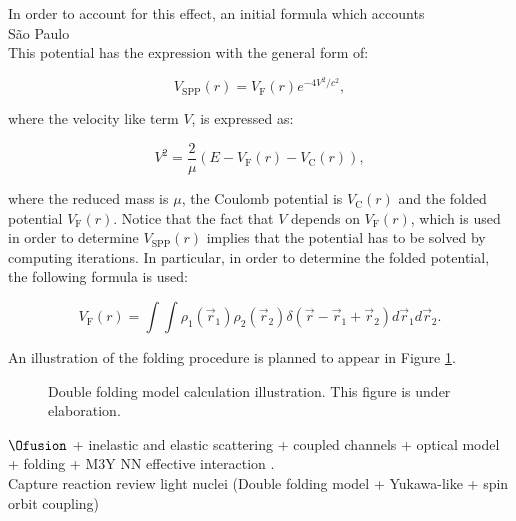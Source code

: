 \documentclass[openany]{book}
\begin{document}
In order to account for this effect, an initial formula which accounts  \\

São Paulo \cite{chamon_2007} \\

This potential has the expression with the general form of:

\begin{equation} \label{eq:potential_SaoPaulo}
	V_{\mathrm{SPP}} (r) = V_{\mathrm{F}} (r)e^{-4V^2/c^2},
\end{equation}

where the velocity like term $V$, is expressed as: 

\begin{equation} \label{eq:potential_SaoPaulo_speed}
	V^2 = \frac{2}{\mu} \left( E - V_{\mathrm{F}}(r) - V_{\mathrm{C}}(r) \right),
\end{equation}

where the reduced mass is $\mu$, the Coulomb potential is $V_{\mathrm{C}}(r)$ and the folded potential  $V_{\mathrm{F}}(r)$. Notice that the fact that $V$ depends on $V_{\mathrm{F}}(r)$, which is used in order to determine $V_{\mathrm{SPP}} (r)$ implies that the potential has to be solved by computing iterations. In particular, in order to determine the folded potential, the following formula is used:  

\begin{equation} \label{eq:potential_SaoPaulo_folding}
	V_{\mathrm{F}}(r) = \int \int \rho_1(\vec r_1)  \rho_2(\vec r_2) \delta(\vec r - \vec r_1 +  \vec r_2) {d\vec{r}_1}  {d\vec{r}_2}.
\end{equation}

An illustration of the folding procedure is planned to appear in Figure \ref{fig:DoubleFolding}.

\begin{figure}[H]
	
	\caption[Double folding model calculation illustration]{Double folding model calculation illustration. This figure is under elaboration.}
	\label{fig:DoubleFolding}
\end{figure}

$\Ofusion$ + inelastic and elastic scattering + coupled channels + optical model + folding + M3Y NN effective interaction \cite{hassanain_al_sebiey_2014}.  \\

Capture reaction review light nuclei (Double folding model + Yukawa-like + spin orbit coupling)\cite{ghasemi_sadeghi_2018}
\end{document}
